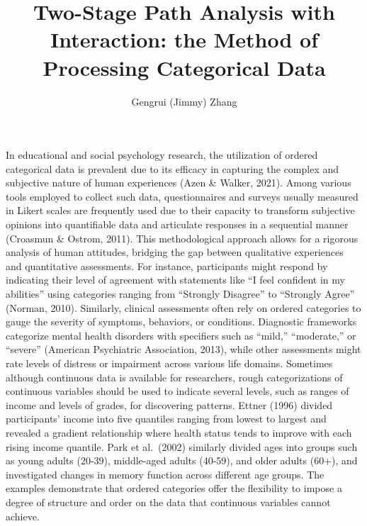 \documentclass[
  man]{apa7}
\title{Two-Stage Path Analysis with Interaction: the Method of Processing Categorical Data}
\author{Gengrui (Jimmy) Zhang\textsuperscript{}}
\date{}
\affiliation{\phantom{0}}
\begin{document}
\maketitle

In educational and social psychology research, the utilization of ordered categorical data is prevalent due to its efficacy in capturing the complex and subjective nature of human experiences (Azen \& Walker, 2021). Among various tools employed to collect such data, questionnaires and surveys usually measured in Likert scales are frequently used due to their capacity to transform subjective opinions into quantifiable data and articulate responses in a sequential manner (Croasmun \& Ostrom, 2011). This methodological approach allows for a rigorous analysis of human attitudes, bridging the gap between qualitative experiences and quantitative assessments. For instance, participants might respond by indicating their level of agreement with statements like ``I feel confident in my abilities'' using categories ranging from ``Strongly Disagree'' to ``Strongly Agree'' (Norman, 2010). Similarly, clinical assessments often rely on ordered categories to gauge the severity of symptoms, behaviors, or conditions. Diagnostic frameworks categorize mental health disorders with specifiers such as ``mild,'' ``moderate,'' or ``severe'' (American Psychiatric Association, 2013), while other assessments might rate levels of distress or impairment across various life domains. Sometimes although continuous data is available for researchers, rough categorizations of continuous variables should be used to indicate several levels, such as ranges of income and levels of grades, for discovering patterns. Ettner (1996) divided participants' income into five quantiles ranging from lowest to largest and revealed a gradient relationship where health status tends to improve with each rising income quantile. Park et al.~(2002) similarly divided ages into groups such as young adults (20-39), middle-aged adults (40-59), and older adults (60+), and investigated changes in memory function across different age groups. The examples demonstrate that ordered categories offer the flexibility to impose a degree of structure and order on the data that continuous variables cannot achieve.
\end{document}
